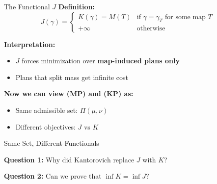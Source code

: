 \documentclass[aspectratio=169]{beamer}
\begin{document}
\begin{frame}{The Functional $J$}
\textbf{Definition:}
\[
\boxed{J(\gamma) = \begin{cases}
K(\gamma) = M(T) & \text{if } \gamma = \gamma_T \text{ for some map } T \\
+\infty & \text{otherwise}
\end{cases}}
\]

\vspace{0.4cm}
\textbf{Interpretation:}
\begin{itemize}
    \item $J$ forces minimization over \textbf{map-induced plans only}
    \item Plans that split mass get infinite cost
\end{itemize}

\vspace{0.4cm}
\textbf{Now we can view (MP) and (KP) as:}
\begin{itemize}
    \item Same admissible set: $\Pi(\mu, \nu)$
    \item Different objectives: $J$ vs $K$
\end{itemize}
\end{frame}

\begin{frame}{Same Set, Different Functionals}
\begin{center}
\end{center}

\vspace{0.3cm}
\textbf{Question 1:} Why did Kantorovich replace $J$ with $K$?

\textbf{Question 2:} Can we prove that $\inf K = \inf J$?
\end{frame}
\end{document}
